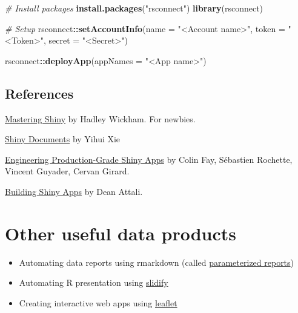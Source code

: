 \documentclass[
]{book}
\newenvironment{Shaded}{\begin{snugshade}}{\end{snugshade}}
\newcommand{\CommentTok}[1]{\textcolor[rgb]{0.56,0.35,0.01}{\textit{#1}}}
\newcommand{\DataTypeTok}[1]{\textcolor[rgb]{0.13,0.29,0.53}{#1}}
\newcommand{\KeywordTok}[1]{\textcolor[rgb]{0.13,0.29,0.53}{\textbf{#1}}}
\newcommand{\NormalTok}[1]{#1}
\newcommand{\OperatorTok}[1]{\textcolor[rgb]{0.81,0.36,0.00}{\textbf{#1}}}
\newcommand{\StringTok}[1]{\textcolor[rgb]{0.31,0.60,0.02}{#1}}
\providecommand{\tightlist}{%
  \setlength{\itemsep}{0pt}\setlength{\parskip}{0pt}}
\begin{document}
\begin{Shaded}
\begin{Highlighting}[]
\CommentTok{\# Install packages }
\KeywordTok{install.packages}\NormalTok{(}\StringTok{"rsconnect"}\NormalTok{)}
\KeywordTok{library}\NormalTok{(rsconnect)}

\CommentTok{\# Setup }
\NormalTok{rsconnect}\OperatorTok{::}\KeywordTok{setAccountInfo}\NormalTok{(}\DataTypeTok{name =} \StringTok{"\textless{}Account name\textgreater{}"}\NormalTok{, }
                          \DataTypeTok{token =} \StringTok{"\textless{}Token\textgreater{}"}\NormalTok{,}
                          \DataTypeTok{secret =} \StringTok{"\textless{}Secret\textgreater{}"}\NormalTok{)}

\NormalTok{rsconnect}\OperatorTok{::}\KeywordTok{deployApp}\NormalTok{(}\DataTypeTok{appNames =} \StringTok{"\textless{}App name\textgreater{}"}\NormalTok{)}
\end{Highlighting}
\end{Shaded}

\hypertarget{references-3}{%
\subsection{References}\label{references-3}}

\href{https://mastering-shiny.org/}{Mastering Shiny} by Hadley Wickham. For newbies.

\href{https://bookdown.org/yihui/rmarkdown/shiny-documents.html}{Shiny Documents} by Yihui Xie

\href{https://engineering-shiny.org/}{Engineering Production-Grade Shiny Apps} by Colin Fay, Sébastien Rochette, Vincent Guyader, Cervan Girard.

\href{https://stat545.com/shiny-tutorial.html}{Building Shiny Apps} by Dean Attali.

\hypertarget{other-useful-data-products}{%
\section{Other useful data products}\label{other-useful-data-products}}

\begin{itemize}
\tightlist
\item
  Automating data reports using rmarkdown (called \href{https://rmarkdown.rstudio.com/developer_parameterized_reports.html\%23parameter_types\%2F}{parameterized reports})
\item
  Automating R presentation using \href{http://slidify.org/index.html}{slidify}
\item
  Creating interactive web apps using \href{https://rstudio.github.io/leaflet/}{leaflet}
\end{itemize}
\end{document}
